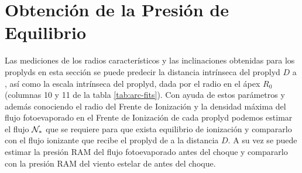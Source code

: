 \section{Obtención de la Presión de Equilibrio}

Las mediciones de los radios característicos y las inclinaciones obtenidas para los proplyds en esta sección se puede predecir la distancia intrínseca del proplyd $D$ a \thC{}, así como la escala intrínseca del proplyd, dada por el radio en el ápex $R_0$ (columnas 10 y 11 de la tabla \ref{tab:arc-fits}). Con ayuda de estos parámetros y además conociendo el radio del Frente de Ionización y la densidad máxima del flujo fotoevaporado en el Frente de Ionización de cada proplyd podemos estimar el flujo $\mathcal{N}_*$ que se requiere para que exista equilibrio de ionización y compararlo con el flujo ionizante que recibe el proplyd de \thC{} a la distancia $D$. A su vez se puede estimar la presión RAM del flujo fotoevaporado antes del choque y compararlo con la presión RAM del viento estelar de \thC{} antes del choque. 





